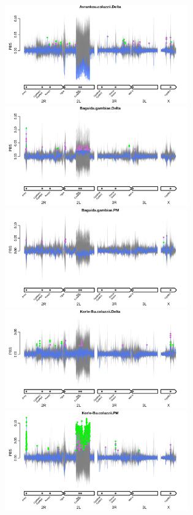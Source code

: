 \documentclass[a4paper,12pt]{article}
\begin{document}
\clearpage

\begin{figure}[h]
	\includegraphics*[width = 7.9cm]{../../randomisations/PBS/Avrankou.coluzzii.Delta_peak_filter_plot.png}
	\vskip 0.4cm
	\includegraphics*[width = 7.9cm]{../../randomisations/PBS/Baguida.gambiae.Delta_peak_filter_plot.png}
	\includegraphics*[width = 7.9cm]{../../randomisations/PBS/Baguida.gambiae.PM_peak_filter_plot.png}
	\vskip 0.4cm
	\includegraphics*[width = 7.9cm]{../../randomisations/PBS/Korle-Bu.coluzzii.Delta_peak_filter_plot.png}
	\includegraphics*[width = 7.9cm]{../../randomisations/PBS/Korle-Bu.coluzzii.PM_peak_filter_plot.png}

\end{figure}
\end{document}
